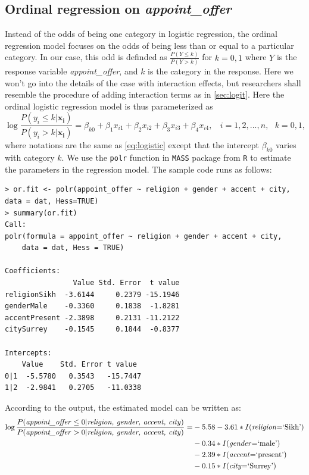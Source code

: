 \documentclass[11pt]{article}
\begin{document}
\subsection{Ordinal regression on \textit{appoint\_offer}}

Instead of the odds of being one category in logistic regression, the ordinal regression model focuses on the odds of being less than or equal to a particular category. In our case, this odd is definded as $ \frac{P(Y\leq k)}{P(Y > k)}$ for $k = 0,1$ where $Y$ is the response variable \textit{appoint\_offer}, and $k$ is the category in the response. Here we won't go into the details of the case with interaction effects, but researchers shall resemble the procedure of adding interaction terms as in \autoref{sec:logit}. Here the ordinal logistic regression model is thus parameterized as
\begin{equation}
    \log \frac{P(y_i\leq k|\mathbf{x_i})}{P(y_i > k|\mathbf{x_i})} = \beta_{k0} + \beta_1x_{i1} + \beta_2x_{i2} + \beta_3x_{i3} + \beta_4x_{i4},\ \ \ \ i=1,2,...,n,\ \ \ k=0,1,
    \label{eq:ordinal}
\end{equation}
where notations are the same as \autoref{eq:logistic} except that the intercept $\beta_{k0}$ varies with category $k$. We use the \texttt{polr} function in \texttt{MASS} package from \texttt{R} to estimate the parameters in the regression model. The sample code runs as follows:
\begin{verbatim}
> or.fit <- polr(appoint_offer ~ religion + gender + accent + city, data = dat, Hess=TRUE)
> summary(or.fit)
Call:
polr(formula = appoint_offer ~ religion + gender + accent + city, 
    data = dat, Hess = TRUE)

Coefficients:
                Value Std. Error  t value
religionSikh  -3.6144     0.2379 -15.1946
genderMale    -0.3360     0.1838  -1.8281
accentPresent -2.3898     0.2131 -11.2122
citySurrey    -0.1545     0.1844  -0.8377

Intercepts:
    Value    Std. Error t value 
0|1  -5.5780   0.3543   -15.7447
1|2  -2.9841   0.2705   -11.0338
\end{verbatim}
According to the output, the estimated model can be written as:
\begin{equation}
    \begin{split}
    \log \frac{P(\textnormal{\textit{appoint\_offer}} \leq 0 |\textnormal{\textit{religion, gender, accent, city}})}{P(\textnormal{\textit{appoint\_offer}} > 0|\textnormal{\textit{religion, gender, accent, city}})}  = & -5.58 - 3.61*I\textnormal{(\textit{religion}=`Sikh')} \\ & -0.34 *I\textnormal{(\textit{gender}=`male')}   \\
    & -2.39*I\textnormal{(\textit{accent}=`present')} \\ &   -0.15*I\textnormal{(\textit{city}=`Surrey')} 
    \end{split}
\end{equation}
\end{document}

